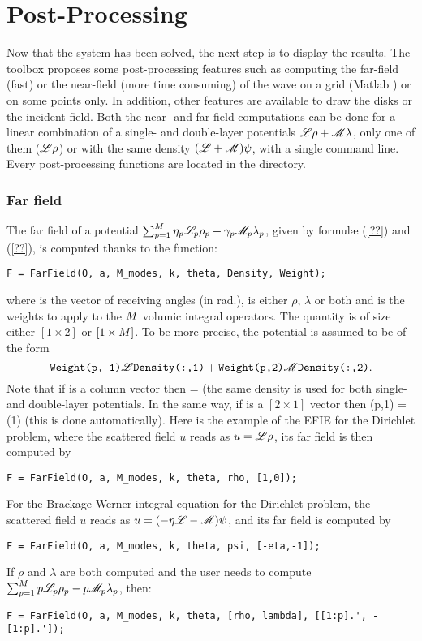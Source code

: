 \section{Post-Processing}

Now that the system has been solved, the next step is to display the results. The \mudiff toolbox proposes some post-processing features such as computing the far-field (fast) or the near-field (more time consuming) of the wave on a grid (Matlab ) or on some points only. In addition, other features are available to draw the disks or the incident field. Both the near- and far-field computations can be done for a linear combination of a single- and double-layer potentials ${\mathscr L}\rho + {\mathscr M}\lambda$, only one of them (\eg ${\mathscr L}\rho$) or with the same density $({\mathscr L}+{\mathscr M})\psi$, with a single command line. Every post-processing functions are located in the  directory.

\subsubsection{Far field}

The far field of a potential $\sum_{p=1}^{M}\eta_p{\mathscr L}_p\rho_p + \gamma_p{\mathscr M}_p\lambda_p$, given by formul\ae{} (\ref{??}) and (\ref{??}), is computed thanks to the  function:
\begin{verbatim}
F = FarField(O, a, M_modes, k, theta, Density, Weight);
\end{verbatim}
where  is the vector of receiving angles (in rad.),  is either $\rho$, $\lambda$ or both and  is the weights to apply to the $M$ volumic integral operators. The quantity  is of size either $[1\times2]$ or $[1\times M]$. To be more precise, the potential is assumed to be of the form
$$
\texttt{Weight(p, 1)}{\mathscr L}\texttt{Density(:,1)} + \texttt{Weight(p,2)}{\mathscr M}\texttt{Density(:,2)}.
$$
Note that if  is a column vector then  =  (the same density is used for both single- and double-layer potentials. In the same way, if  is a $[2\times1]$ vector then (p,1) = (1) (this is done automatically). Here is the example of the EFIE for the Dirichlet problem, where the scattered field $u$ reads as $u = {\mathscr L}\rho$, its far field is then computed by
\begin{verbatim}
F = FarField(O, a, M_modes, k, theta, rho, [1,0]);
\end{verbatim}
For the Brackage-Werner integral equation for the Dirichlet problem,  the scattered field $u$ reads as $u = (-\eta{\mathscr L}-{\mathscr M})\psi$, and its far field is computed by
\begin{verbatim}
F = FarField(O, a, M_modes, k, theta, psi, [-eta,-1]);
\end{verbatim}
If $\rho$ and $\lambda$ are both computed and the user needs to compute $\sum_{p=1}^{M} p{\mathscr L}_p\rho_p - p{\mathscr M}_p\lambda_p$, then: 
\begin{verbatim}
F = FarField(O, a, M_modes, k, theta, [rho, lambda], [[1:p].', -[1:p].']);
\end{verbatim}

